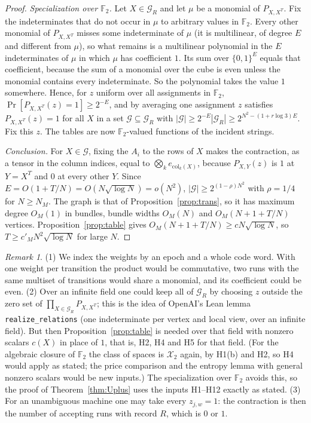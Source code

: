 \documentclass[11pt]{article}
\theoremstyle{definition}
\theoremstyle{remark}
\newtheorem{remark}[theorem]{Remark}
\newcommand{\F}{\mathbb F}
\newcommand{\X}{\mathcal X}
\begin{document}
\begin{proof}
\emph{Specialization over $\F_2$.} Let $X\in\mathcal G_R$ and let $\mu$ be a monomial of $P_{X,X^T}$. Fix the indeterminates that
do not occur in $\mu$ to arbitrary values in $\F_2$. Every other monomial of $P_{X,X^T}$ misses some indeterminate of $\mu$ (it is
multilinear, of degree $E$ and different from $\mu$), so what remains is a multilinear polynomial in the $E$ indeterminates of $\mu$
in which $\mu$ has coefficient $1$. Its sum over $\{0,1\}^E$ equals that coefficient, because the sum of a monomial over the cube is
even unless the monomial contains every indeterminate. So the polynomial takes the value $1$ somewhere. Hence, for $z$ uniform over
all assignments in $\F_2$, $\Pr[P_{X,X^T}(z)=1]\ge2^{-E}$, and by averaging one assignment $z$ satisfies $P_{X,X^T}(z)=1$ for all
$X$ in a set $\mathcal G\subseteq\mathcal G_R$ with $|\mathcal G|\ge2^{-E}|\mathcal G_R|\ge2^{N^2-(1+r\log3)E}$. Fix this $z$.
The tables are now $\F_2$-valued functions of the incident strings.

\emph{Conclusion.} For $X\in\mathcal G$, fixing the $A_i$ to the rows of $X$ makes the contraction, as a tensor in the column
indices, equal to $\bigotimes_ke_{\mathrm{col}_k(X)}$, because $P_{X,Y}(z)$ is $1$ at $Y=X^T$ and $0$ at every other $Y$. Since
$E=O(1+T/N)=O(N\sqrt{\log N})=o(N^2)$, $|\mathcal G|\ge2^{(1-\rho)N^2}$ with $\rho=1/4$ for $N\ge N_M$. The graph is that of
Proposition~\ref{prop:trans}, so it has maximum degree $O_M(1)$ in bundles, bundle widths $O_M(N)$ and $O_M(N+1+T/N)$ vertices.
Proposition~\ref{prop:table} gives $O_M(N+1+T/N)\ge cN\sqrt{\log N}$, so $T\ge c'_MN^2\sqrt{\log N}$ for large $N$.
\end{proof}

\begin{remark}
(1) We index the weights by an epoch and a whole code word. With one weight per transition the product would be commutative,
two runs with the same multiset of transitions would share a monomial, and its coefficient could be even. (2) Over an infinite field
one could keep all of $\mathcal G_R$ by choosing $z$ outside the zero set of $\prod_{X\in\mathcal G_R}P_{X,X^T}$; this is the idea of
OpenAI's Lean lemma \texttt{realize\_relations} (one indeterminate per vertex and local view, over an infinite field). But then Proposition~\ref{prop:table} is needed over that field with
nonzero scalars $c(X)$ in place of $1$, that is, H2, H4 and H5 for that field. (For the algebraic closure of $\F_2$ the class of spaces is $\X_2$ again, by H1(b) and
H2, so H4 would apply as stated; the price comparison and the entropy lemma with general nonzero scalars would be new inputs.) The specialization over $\F_2$ avoids this, so
the proof of Theorem~\ref{thm:Uplus} uses the inputs H1--H12 exactly as stated. (3) For an unambiguous machine one may take every $z_{j,w}=1$: the
contraction is then the number of accepting runs with record $R$, which is $0$ or $1$.
\end{remark}
\end{document}
